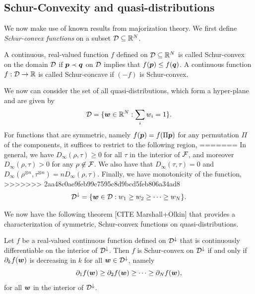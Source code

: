 \documentclass[pra,
aps,
twocolumn,
superscriptaddress,
groupedaddress,
nofootinbib,
reprint
]{revtex4-1}
\begin{document}
\newpage

\subsection{Schur-Convexity and quasi-distributions}
We now make use of known results from majorization theory. We first define \emph{Schur-convex functions} on a subset ${\mathcal D} \subseteq \mathbb{R}^N$.

\begin{definition} A continuous, real-valued function $f$ defined on ${\mathcal D} \subseteq \mathbb{R}^N$ is called Schur-convex on the domain ${\mathcal D}$ if $\boldsymbol{p} \prec \boldsymbol{q}$ on ${\mathcal D}$ implies that $f(\boldsymbol{p}) \le f(\boldsymbol{q})$. A continuous function $f:{\mathcal D} \rightarrow \mathbb{R}$ is called Schur-concave if $(-f)$ is Schur-convex.
\end{definition}
We now can consider the set of all quasi-distributions, which form a hyper-plane and are given by
\begin{equation}
{\mathcal D} = \{ \boldsymbol{w} \in \mathbb{R}^N: \sum_i w_i = 1\}.
\end{equation}
For functions that are symmetric, namely $f(\boldsymbol{p}) = f(\Pi \boldsymbol{p})$ for any permutation $\Pi$ of the components, it suffices to restrict to the following region,
=======
In general, we have $D_\infty(\rho, \tau) \ge 0$ for all $\tau$ in the interior of ${\mathcal F}$, and moreover $D_\infty(\rho , \tau) > 0$ for any $\rho \not \in {\mathcal F}$. We also have that $D_\infty(\tau , \tau) = 0$ and $D_\infty(\rho^{\otimes n}, \tau^{\otimes n}) = n D_\infty(\rho ,\tau)$. Finally, we have monotonicity of the function, 
>>>>>>> 2aa48c0ae9feb99c7595c8d9bcd5feb806a34ad8
\begin{equation}
{\mathcal D}^\downarrow = \{ \boldsymbol{w} \in {\mathcal D} : w_1 \ge w_2 \ge \cdots \ge w_N\}.
\end{equation}

We now have the following theorem [CITE Marshall+Olkin] that provides a characterization of symmetric, Schur-convex functions on quasi-distributions.
\begin{theorem} Let $f$ be a real-valued continuous function defined on ${\mathcal D}^\downarrow$ that is continuously differentiable on the interior of ${\mathcal D}^\downarrow$. Then $f$ is Schur-convex on ${\mathcal D}^\downarrow$ if and only if $\partial_k f(\boldsymbol{w})$ is decreasing in $k$ for all $\boldsymbol{w} \in {\mathcal D}^\downarrow$, namely
\begin{equation}
\partial_1 f(\boldsymbol{w}) \ge \partial_2 f(\boldsymbol{w}) \ge \cdots \ge \partial_N f(\boldsymbol{w}),
\end{equation}
for all $\boldsymbol{w}$ in the interior of ${\mathcal D}^\downarrow$.
\end{theorem}
\end{document}

